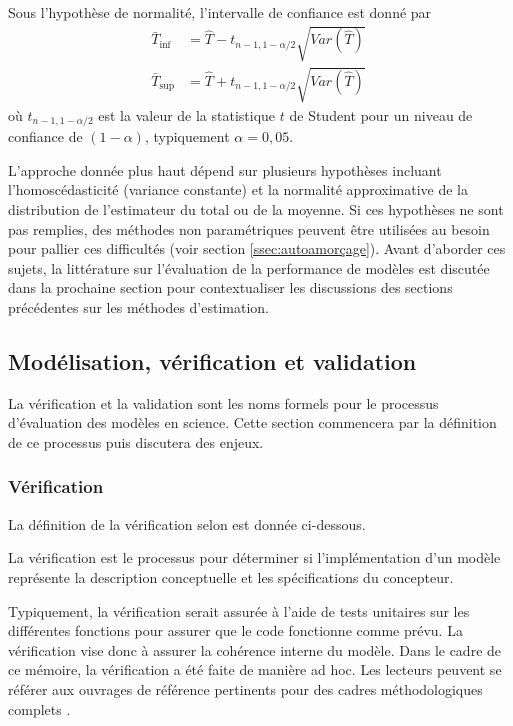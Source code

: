                 Sous l'hypothèse de normalité, l'intervalle de confiance est donné par
                \begin{align}
                    \bar{T}_{\text{inf}} &= \hat{T} - t_{n-1, 1-\alpha/2} \sqrt{Var(\hat{T})} \\
                    \bar{T}_{\text{sup}} &= \hat{T} + t_{n-1, 1-\alpha/2} \sqrt{Var(\hat{T})} \
                \end{align}
                où $t_{n-1, 1-\alpha/2}$ est la valeur de la statistique $t$ de Student pour un niveau de confiance de $(1-\alpha)$, typiquement $\alpha = 0{,}05$. \par
               
                L'approche donnée plus haut dépend sur plusieurs hypothèses incluant l'homoscédasticité (variance constante) et la normalité approximative de la distribution de l’estimateur du total ou de la moyenne. Si ces hypothèses ne sont pas remplies, des méthodes non paramétriques peuvent être utilisées au besoin pour pallier ces difficultés (voir section \ref{ssec:autoamorçage}). Avant d'aborder ces sujets, la littérature sur l'évaluation de la performance de modèles est discutée dans la prochaine section pour contextualiser les discussions des sections précédentes sur les méthodes d'estimation.
    
    
    \subsection{Modélisation, vérification et validation}\label{sec:deterministic-model-validation}
        
        La vérification et la validation sont les noms formels pour le processus d'évaluation des modèles en science. Cette section commencera par la définition de ce processus puis discutera des enjeux.
        \subsubsection{Vérification}
            La définition de la vérification selon \textcite{national_research_council_assessing_2012} est donnée ci-dessous.
            \begin{definition}
                La vérification est le processus pour déterminer si l'implémentation d'un modèle représente la description conceptuelle et les spécifications du concepteur.
            \end{definition}
            Typiquement, la vérification serait assurée à l'aide de tests unitaires sur les différentes fonctions pour assurer que le code fonctionne comme prévu. La vérification vise donc à assurer la cohérence interne du modèle. Dans le cadre de ce mémoire, la vérification a été faite de manière ad hoc. Les lecteurs peuvent se référer aux ouvrages de référence pertinents  pour des cadres méthodologiques complets \parencite{sale_testing_2014,saleh_javascript_2013}.\par
        
